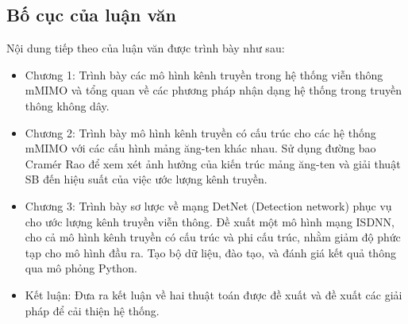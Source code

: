 \subsection*{Bố cục của luận văn}
\vspace{0.5cm}

Nội dung tiếp theo của luận văn được trình bày như sau:

\renewcommand{\labelitemi}{$-$}
\begin{itemize}
	\item Chương 1: Trình bày các mô hình kênh truyền trong hệ thống viễn thông mMIMO và tổng quan về các phương pháp nhận dạng hệ thống trong truyền thông không dây.
    \item Chương 2: Trình bày mô hình kênh truyền có cấu trúc cho các hệ thống mMIMO với các cấu hình mảng ăng-ten khác nhau. Sử dụng đường bao Cramér Rao  để xem xét ảnh hưởng của kiến trúc mảng ăng-ten và giải thuật SB đến hiệu suất của việc ước lượng kênh truyền.
	\item Chương 3: Trình bày sơ lược về mạng DetNet (Detection network) phục vụ cho ước lượng kênh truyền viễn thông. Đề xuất một mô hình mạng ISDNN, cho cả mô hình kênh truyền có cấu trúc và phi cấu trúc, nhằm giảm độ phức tạp cho mô hình đầu ra. Tạo bộ dữ liệu, đào tạo, và đánh giá kết quả thông qua mô phỏng Python.
	\item Kết luận: Đưa ra kết luận về hai thuật toán được đề xuất và đề xuất các giải pháp để cải thiện hệ thống.
\end{itemize} 
